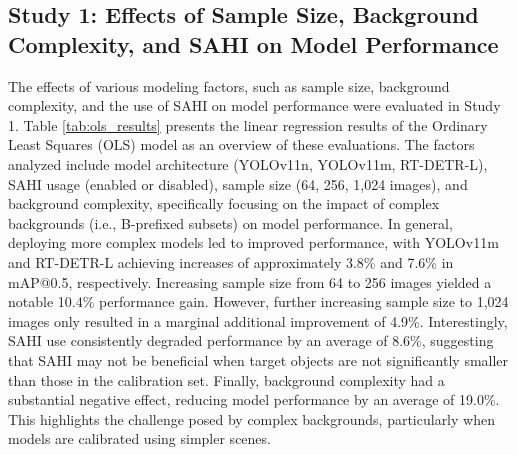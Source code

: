 \subsection{Study 1: Effects of Sample Size, Background Complexity, and SAHI on Model Performance}

The effects of various modeling factors, such as sample size, background complexity, and the use of SAHI on model performance were evaluated in Study 1. Table \ref{tab:ols_results} presents the linear regression results of the Ordinary Least Squares (OLS) model as an overview of these evaluations. The factors analyzed include model architecture (YOLOv11n, YOLOv11m, RT-DETR-L), SAHI usage (enabled or disabled), sample size (64, 256, 1,024 images), and background complexity, specifically focusing on the impact of complex backgrounds (i.e., B-prefixed subsets) on model performance. In general, deploying more complex models led to improved performance, with YOLOv11m and RT-DETR-L achieving increases of approximately 3.8\% and 7.6\% in mAP@0.5, respectively. Increasing sample size from 64 to 256 images yielded a notable 10.4\% performance gain. However, further increasing sample size to 1,024 images only resulted in a marginal additional improvement of 4.9\%. Interestingly, SAHI use consistently degraded performance by an average of 8.6\%, suggesting that SAHI may not be beneficial when target objects are not significantly smaller than those in the calibration set. Finally, background complexity had a substantial negative effect, reducing model performance by an average of 19.0\%. This highlights the challenge posed by complex backgrounds, particularly when models are calibrated using simpler scenes.

